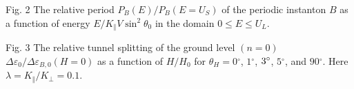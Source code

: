 \begin{references}
Fig. 2 The relative period $P_B\left( E\right) /P_B\left( E=U_S\right) $ of
the periodic instanton $B$ as a function of energy $E/K_{\Vert }V\sin
^2\theta _0$ in the domain $0\leq E\leq U_L$.

Fig. 3 The relative tunnel splitting of the ground level $\left( n=0\right) $
$\Delta \varepsilon _0/\Delta \varepsilon _{B,0}\left( H=0\right) $ as a
function of $H/H_0$ for $\theta _H=0{{}^{\circ }}$, $1{{}^{\circ }}$, $3{%
{}^{\circ }}$, $5{{}^{\circ }}$, and $90{{}^{\circ }}$. Here $\lambda
=K_{\Vert }/K_{\bot }=0.1$.
\end{references}


